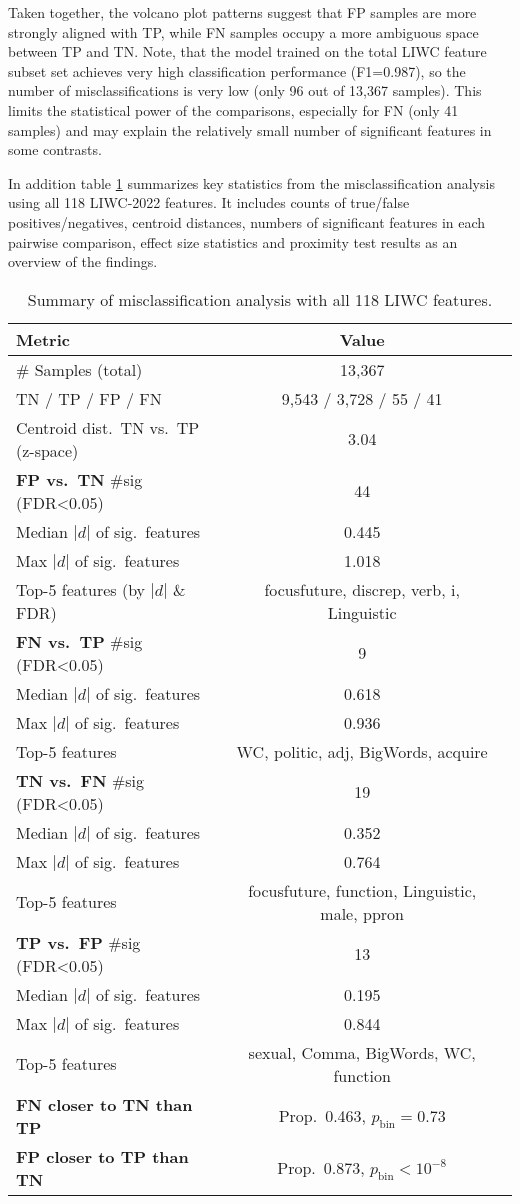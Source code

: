 Taken together, the volcano plot patterns suggest that FP samples are more strongly aligned with TP, while FN samples occupy a more ambiguous space between TP and TN. Note, that the model trained on the total LIWC feature subset set achieves very high classification performance (F1=0.987), so the number of misclassifications is very low (only 96 out of 13,367 samples). This limits the statistical power of the comparisons, especially for FN (only 41 samples) and may explain the relatively small number of significant features in some contrasts. 


In addition table \ref{tab:liwc-misclass-all} summarizes key statistics from the misclassification analysis using all 118 LIWC-2022 features. It includes counts of true/false positives/negatives, centroid distances, numbers of significant features in each pairwise comparison, effect size statistics and proximity test results as an overview of the findings.


\begin{table}[H]
\centering
\caption{Summary of misclassification analysis with all 118 LIWC features.}
\label{tab:liwc-misclass-all}
\begin{tabular}{lcc}
\toprule
Metric & Value \\
\midrule
\# Samples (total) & 13,367 \\
TN / TP / FP / FN & 9,543 / 3,728 / 55 / 41 \\
Centroid dist.\ TN vs.\ TP (z-space) & 3.04 \\
\midrule
\textbf{FP vs.\ TN} \#sig (FDR<0.05) & 44 \\
Median $|d|$ of sig.\ features & 0.445 \\
Max $|d|$ of sig.\ features & 1.018 \\
Top-5 features (by $|d|$ \& FDR) & focusfuture, discrep, verb, i, Linguistic \\
\midrule
\textbf{FN vs.\ TP} \#sig (FDR<0.05) & 9 \\
Median $|d|$ of sig.\ features & 0.618 \\
Max $|d|$ of sig.\ features & 0.936 \\
Top-5 features & WC, politic, adj, BigWords, acquire \\
\midrule
\textbf{TN vs.\ FN} \#sig (FDR<0.05) & 19 \\
Median $|d|$ of sig.\ features & 0.352 \\
Max $|d|$ of sig.\ features & 0.764 \\
Top-5 features & focusfuture, function, Linguistic, male, ppron \\
\midrule
\textbf{TP vs.\ FP} \#sig (FDR<0.05) & 13 \\
Median $|d|$ of sig.\ features & 0.195 \\
Max $|d|$ of sig.\ features & 0.844 \\
Top-5 features & sexual, Comma, BigWords, WC, function \\
\midrule
\textbf{FN closer to TN than TP} & Prop.\ 0.463, $p_{\text{bin}}=0.73$ \\
\textbf{FP closer to TP than TN} & Prop.\ 0.873, $p_{\text{bin}}<10^{-8}$ \\
\bottomrule
\end{tabular}
\end{table}

